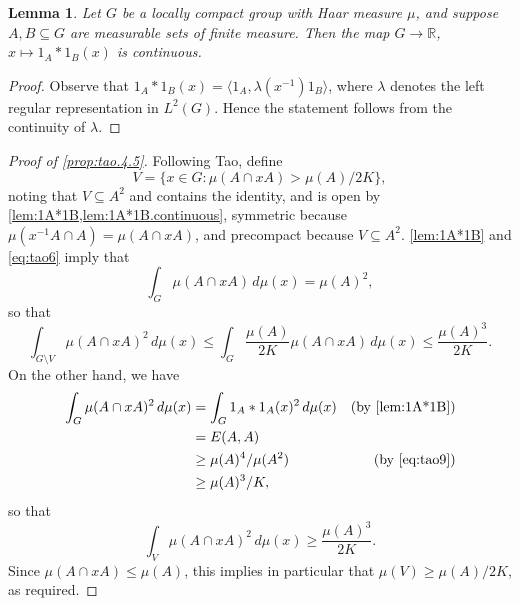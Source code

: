 \documentclass[10pt]{article}
\newcommand{\R}{\mathbb{R}}
\newtheorem{lemma}[lemma]{Lemma}
\begin{document}
\begin{lemma}\label{lem:1A*1B.continuous}
Let $G$ be a locally compact group with Haar measure $\mu$, and suppose $A,B\subseteq G$ are measurable sets of finite measure. Then the map $G\to\R$, $x\mapsto 1_A\ast1_B(x)$ is continuous.
\end{lemma}
\begin{proof}
Observe that $1_A\ast1_B(x)=\langle 1_A,\lambda(x^{-1})1_B\rangle$, where $\lambda$ denotes the left regular representation in $L^2(G)$. Hence the statement follows from the continuity of $\lambda$.
\end{proof}
\begin{proof}[Proof of \cref{prop:tao.4.5}]
Following Tao, define
\[
V=\{x\in G:\mu(A\cap xA)>\mu(A)/2K\},
\]
noting that $V\subseteq A^2$ and contains the identity, and is open by \cref{lem:1A*1B,lem:1A*1B.continuous}, symmetric because $\mu(x^{-1}A\cap A)=\mu(A\cap xA)$, and precompact because $V\subseteq A^2$. \cref{lem:1A*1B} and \eqref{eq:tao6} imply that
\[
\int_G\mu(A\cap xA)\,d\mu(x)=\mu(A)^2,
\]
so that
\[
\int_{G\setminus V}\mu(A\cap xA)^2\,d\mu(x)\le\int_G\frac{\mu(A)}{2K}\mu(A\cap xA)\,d\mu(x)\le\frac{\mu(A)^3}{2K}.
\]
On the other hand, we have
\begin{align*}
\int_G\mu(A\cap xA)^2\,d\mu(x)&=\int_G1_A\ast1_A(x)^2\,d\mu(x)&\text{(by \cref{lem:1A*1B})}\\
				&=E(A,A)\\
				&\ge\mu(A)^4/\mu(A^2)&\text{(by \eqref{eq:tao9})}\\
				&\ge\mu(A)^3/K,
\end{align*}
so that
\[
\int_V\mu(A\cap xA)^2\,d\mu(x)\ge\frac{\mu(A)^3}{2K}.
\]
Since $\mu(A\cap xA)\le\mu(A)$, this implies in particular that $\mu(V)\ge\mu(A)/2K$, as required.


\end{proof}
\end{document}

